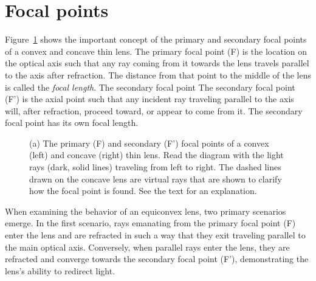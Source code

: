 \documentclass[
  letterpaper,
]{book}
\begin{document}
\section{Focal points}\label{sec-optics-focalpoints}

Figure~\ref{fig-thinlens-focalpoints} shows the important concept of the
primary and secondary focal points of a convex and concave thin lens.
The primary focal point (F) is the location on the optical axis such
that any ray coming from it towards the lens travels parallel to the
axis after refraction. The distance from that point to the middle of the
lens is called the \emph{focal length}. The secondary focal point The
secondary focal point (F') is the axial point such that any incident ray
traveling parallel to the axis will, after refraction, proceed toward,
or appear to come from it. The secondary focal point has its own focal
length.

\begin{figure}


\caption{\label{fig-thinlens-focalpoints}(a) The primary (F) and
secondary (F') focal points of a convex (left) and concave (right) thin
lens. Read the diagram with the light rays (dark, solid lines) traveling
from left to right. The dashed lines drawn on the concave lens are
virtual rays that are shown to clarify how the focal point is found. See
the text for an explanation.}

\end{figure}%

When examining the behavior of an equiconvex lens, two primary scenarios
emerge. In the first scenario, rays emanating from the primary focal
point (F) enter the lens and are refracted in such a way that they exit
traveling parallel to the main optical axis. Conversely, when parallel
rays enter the lens, they are refracted and converge towards the
secondary focal point (F'), demonstrating the lens's ability to redirect
light.
\end{document}
